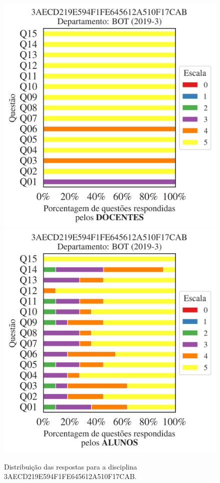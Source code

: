 \documentclass[a4paper,10pt]{article}
\begin{document}
\begin{figure}[h]
\centering
\includegraphics[width=0.485\linewidth]{analise_disciplina_departamento_BOT_3AECD219E594F1FE645612A510F17CAB_docentes.png}
\includegraphics[width=0.485\linewidth]{analise_disciplina_departamento_BOT_3AECD219E594F1FE645612A510F17CAB_alunos.png}
\caption{\label{fig:analise_geral_departamento}                Distribuição das respostas para a disciplina 3AECD219E594F1FE645612A510F17CAB. }
\end{figure}
\end{document}
